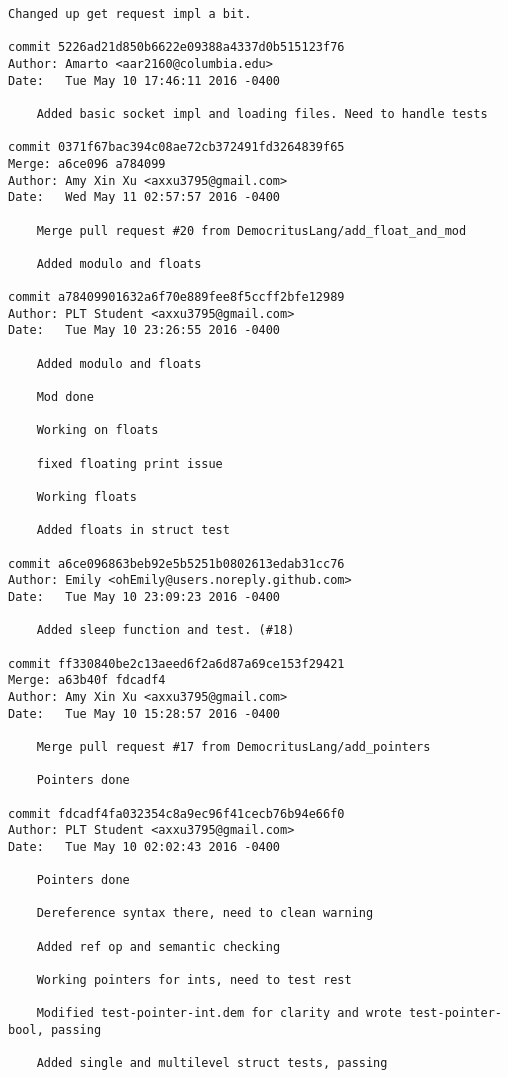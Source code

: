\begin{lstlisting}[backgroundcolor=\color{white}]
    Changed up get request impl a bit.

commit 5226ad21d850b6622e09388a4337d0b515123f76
Author: Amarto <aar2160@columbia.edu>
Date:   Tue May 10 17:46:11 2016 -0400

    Added basic socket impl and loading files. Need to handle tests

commit 0371f67bac394c08ae72cb372491fd3264839f65
Merge: a6ce096 a784099
Author: Amy Xin Xu <axxu3795@gmail.com>
Date:   Wed May 11 02:57:57 2016 -0400

    Merge pull request #20 from DemocritusLang/add_float_and_mod
    
    Added modulo and floats

commit a78409901632a6f70e889fee8f5ccff2bfe12989
Author: PLT Student <axxu3795@gmail.com>
Date:   Tue May 10 23:26:55 2016 -0400

    Added modulo and floats
    
    Mod done
    
    Working on floats
    
    fixed floating print issue
    
    Working floats
    
    Added floats in struct test

commit a6ce096863beb92e5b5251b0802613edab31cc76
Author: Emily <ohEmily@users.noreply.github.com>
Date:   Tue May 10 23:09:23 2016 -0400

    Added sleep function and test. (#18)

commit ff330840be2c13aeed6f2a6d87a69ce153f29421
Merge: a63b40f fdcadf4
Author: Amy Xin Xu <axxu3795@gmail.com>
Date:   Tue May 10 15:28:57 2016 -0400

    Merge pull request #17 from DemocritusLang/add_pointers
    
    Pointers done

commit fdcadf4fa032354c8a9ec96f41cecb76b94e66f0
Author: PLT Student <axxu3795@gmail.com>
Date:   Tue May 10 02:02:43 2016 -0400

    Pointers done
    
    Dereference syntax there, need to clean warning
    
    Added ref op and semantic checking
    
    Working pointers for ints, need to test rest
    
    Modified test-pointer-int.dem for clarity and wrote test-pointer-bool, passing
    
    Added single and multilevel struct tests, passing
    

\end{lstlisting}
